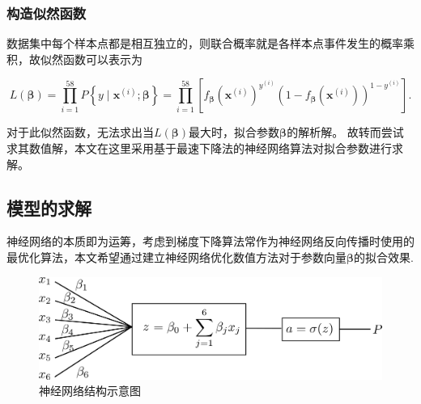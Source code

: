 
\subsubsection{构造似然函数} %
\label{ssub:构造似然函数}

数据集中每个样本点都是相互独立的，则联合概率就是各样本点事件发生的概率乘积，故似然函数可以表示为

\begin{equation}
	L(\boldsymbol{\beta})=\prod_{i=1}^{58} P\left\{y \mid \boldsymbol{x}^{(i)} ; \boldsymbol{\beta}\right\}=\prod_{i=1}^{58}\left[f_{\boldsymbol{\beta}}\left(\boldsymbol{x}^{(i)}\right)^{y^{(i)}}\left(1-f_{\boldsymbol{\beta}}\left(\boldsymbol{x}^{(i)}\right)\right)^{1-y^{(i)}}\right].
\end{equation}

对于此似然函数，无法求出当$L(\boldsymbol{\beta})$最大时，拟合参数$\boldsymbol{\beta}$的解析解。
故转而尝试求其数值解，本文在这里采用基于最速下降法的神经网络算法对拟合参数进行求解。







\subsection{模型的求解}

神经网络的本质即为运筹，考虑到梯度下降算法常作为神经网络反向传播时使用的最优化算法，本文希望通过建立神经网络优化数值方法对于参数向量$\boldsymbol{\beta}$的拟合效果.

\begin{figure}[!htp]
	\includegraphics[width=16cm]{figure/node.png}
	\caption{神经网络结构示意图}
\end{figure}

